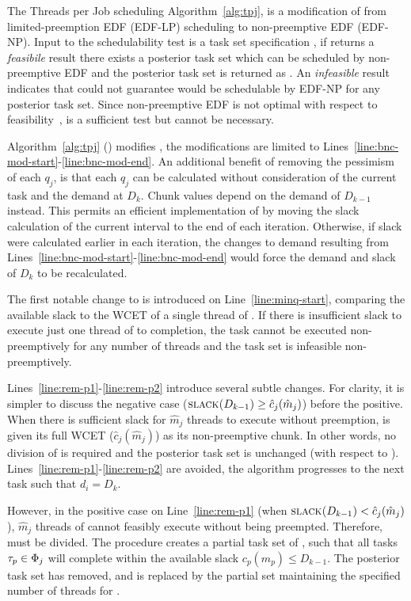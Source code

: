 \documentclass[a4paper,UKenglish,cleveref,autoref,english]{lipics-v2019}
\begin{document}
The Threads per Job scheduling Algorithm~\ref{alg:tpj}, is a
modification of \bng{} from limited-preemption EDF (EDF-LP) scheduling to
non-preemptive EDF (EDF-NP). Input to the schedulability test is a task set
specification \tasks{}, if \tpj{} returns a \emph{feasibile} result
there exists a posterior task set which can be scheduled by
non-preemptive EDF and the posterior task set is
returned as \tasks{}. An \emph{infeasible} result indicates that
\tpj{} could not guarantee \tasks{} would be schedulable by EDF-NP for
any posterior task set. Since non-preemptive EDF is not optimal with
respect to feasibility~\cite{Buttazzo:2011}, \tpj{} is a sufficient
test but cannot be necessary.

Algorithm~\ref{alg:tpj} (\tpj{}) modifies \bng{}, the modifications
are limited to
Lines~\ref{line:bnc-mod-start}-\ref{line:bnc-mod-end}. An additional
benefit of \bng{} removing the pessimism of each ${q_j}$, is
that each ${q_j}$ can be calculated without consideration of the
current task  and the demand at ${D_k}$. Chunk values depend
on the demand of ${D_{k-1}}$ instead. This permits an
efficient implementation of \tpj{} by moving the slack calculation of
the current interval to the end of each iteration. Otherwise, if slack
were calculated earlier in each iteration, the changes to demand
resulting from Lines~\ref{line:bnc-mod-start}-\ref{line:bnc-mod-end}
would force the demand and slack of ${D_k}$ to be recalculated.

The first notable change to \bng{} is introduced on
Line~\ref{line:minq-start}, comparing the available slack to the WCET
of a single thread of . If there is insufficient slack to
execute just one thread of  to completion, the task cannot be
executed non-preemptively for any number of threads and the task set
is infeasible non-preemptively.

Lines~\ref{line:rem-p1}-\ref{line:rem-p2} introduce several
subtle changes. For clarity, it is simpler to discuss
the negative case (${\text{\sc{slack}(\ensuremath{D_{k-1}})} \ge \hat{c}_j(\hat{m}_j)}$)
before the positive.
When there is sufficient slack for ${\hat{m}_j}$ threads to execute
without preemption,  is given its full WCET
(${\hat{c}_j(\hat{m}_j)}$) as its non-preemptive chunk. In other
words, no division of  is required and the posterior task set
\tasks{} is unchanged (with respect to ).
Lines~\ref{line:rem-p1}-\ref{line:rem-p2} are avoided, the
algorithm progresses to the next task such that ${d_i = D_k}$.

However, in the positive case on Line~\ref{line:rem-p1} (when
${\text{\sc{slack}(\ensuremath{D_{k-1}})} < \hat{c}_j(\hat{m}_j)}$), ${\hat{m}_j}$
threads of  cannot feasibly execute without being
preempted. Therefore,  must be divided. The \texdivide{}
procedure creates a partial task  set of , such that
all tasks ${\tau_{p} \in \Phi_{j}}$ will complete within the
available slack ${c_p(m_p) \le D_{k-1}}$. The posterior task set \tasks{}
has  removed, and is replaced by the partial set 
maintaining the specified number of threads for .
\end{document}
